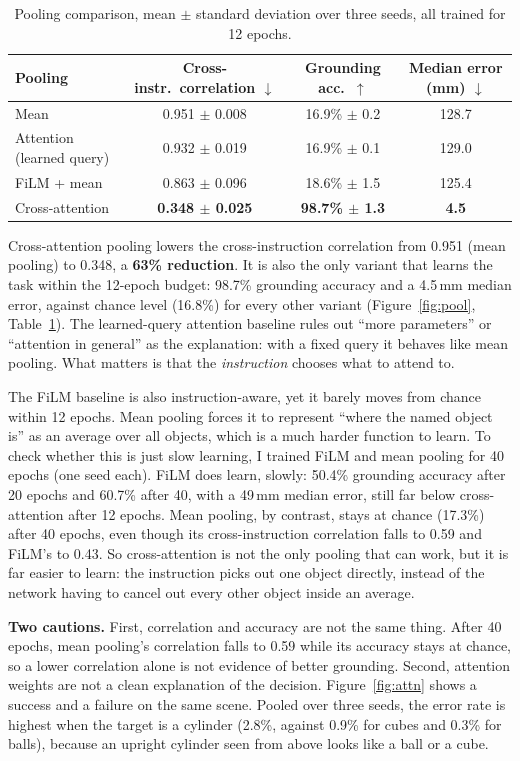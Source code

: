 \documentclass[10pt,a4paper]{article}
\begin{document}
\begin{table}[t]
\centering\small
\begin{tabular}{lccc}
\toprule
Pooling & Cross-instr.\ correlation $\downarrow$ & Grounding acc.\ $\uparrow$ & Median error (mm) $\downarrow$\\
\midrule
Mean & 0.951 $\pm$ 0.008 & 16.9\% $\pm$ 0.2 & 128.7\\
Attention (learned query) & 0.932 $\pm$ 0.019 & 16.9\% $\pm$ 0.1 & 129.0\\
FiLM + mean & 0.863 $\pm$ 0.096 & 18.6\% $\pm$ 1.5 & 125.4\\
Cross-attention & \textbf{0.348 $\pm$ 0.025} & \textbf{98.7\% $\pm$ 1.3} & \textbf{4.5}\\
\bottomrule
\end{tabular}
\caption{Pooling comparison, mean $\pm$ standard deviation over three seeds,
all trained for 12 epochs.}
\label{tab:pool}
\end{table}

Cross-attention pooling lowers the cross-instruction correlation from 0.951
(mean pooling) to 0.348, a \textbf{63\% reduction}. It is also the only
variant that learns the task within the 12-epoch budget: 98.7\% grounding
accuracy and a 4.5\,mm median error, against chance level (16.8\%) for every
other variant (Figure~\ref{fig:pool}, Table~\ref{tab:pool}). The learned-query
attention baseline rules out ``more parameters'' or ``attention in general''
as the explanation: with a fixed query it behaves like mean pooling. What
matters is that the \emph{instruction} chooses what to attend to.

The FiLM baseline is also instruction-aware, yet it barely moves from chance
within 12 epochs. Mean pooling forces it to represent ``where the named object
is'' as an average over all objects, which is a much harder function to learn.
To check whether this is just slow learning, I trained FiLM and mean pooling
for 40 epochs (one seed each). FiLM does learn, slowly: 50.4\% grounding
accuracy after 20 epochs and 60.7\% after 40, with a 49\,mm median error,
still far below cross-attention after 12 epochs. Mean pooling, by contrast, stays at chance (17.3\%) after 40 epochs, even
though its cross-instruction correlation falls to 0.59 and FiLM's to 0.43.
So cross-attention is not the only pooling that can work, but it is far easier
to learn: the instruction picks out one object directly, instead of the
network having to cancel out every other object inside an average.

\textbf{Two cautions.} First, correlation and accuracy are not the same thing.
After 40 epochs, mean pooling's correlation falls to 0.59 while its accuracy
stays at chance, so a lower correlation alone is not evidence of better
grounding.
Second, attention weights are not a clean explanation of the decision.
Figure~\ref{fig:attn} shows a success and a failure on the same scene. Pooled
over three seeds, the error rate is highest when the target is a cylinder
(2.8\%, against 0.9\% for cubes and 0.3\% for balls), because an upright
cylinder seen from above looks like a ball or a cube.
\end{document}
